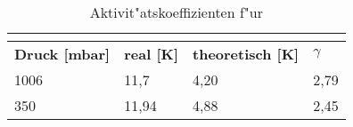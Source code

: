 \begin{table}[H]
	\centering
	\label{tab: Aktivitätskoeffizient_CaCö2}
	\begin{tabular}{|l|l|l|l|}
		\hline
		\multicolumn{4}{|c|}{\textbf{\ce{CaCl2}}}                                                \\\hline
		\textbf{Druck [mbar]} & \textbf{real [K]} & \textbf{theoretisch [K]} & \textbf{$\gamma$} \\\hline
		1006                  & 11,7              & 4,20                     & 2,79              \\
		350                   & 11,94             & 4,88                     & 2,45              \\\hline
	\end{tabular}
	\caption{Aktivit"atskoeffizienten f"ur }
\end{table}

